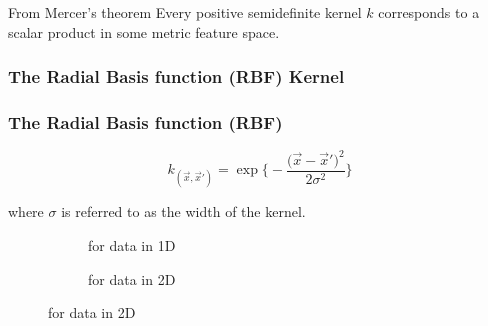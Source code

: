 \begin{frame}\frametitle{\subsubsecname}

\begin{block}{From Mercer's theorem}
Every positive semidefinite kernel $k$ corresponds to a scalar product in
some metric feature space.
\end{block}

\end{frame}

\subsubsection{The Radial Basis function (RBF) Kernel}

\begin{frame}\frametitle{The Radial Basis function (RBF) }


\begin{equation}
	k_{(\vec{x},\vec{x}')} = \exp \bigg\{ -\frac{ \big( \vec{x} - \vec{x}' 
					\big)^2 }{ 2 \sigma^2 } \bigg\}
\end{equation}

where $\sigma$ is referred to as the width of the kernel.

\begin{figure}[ht]
     \centering
     \begin{subfigure}[t]{\textwidth}
         \centering
         \usebox{\imagebox}%
         \caption{for data in 1D}
         \label{fig:quadratic}
     \end{subfigure}
     \hspace{2mm}
     \begin{subfigure}[t]{\textwidth}
         \centering
         \caption{for data in 2D}
         \label{fig:linear}
     \end{subfigure}
	 \label{fig:rbf}
\end{figure}

\end{frame}

